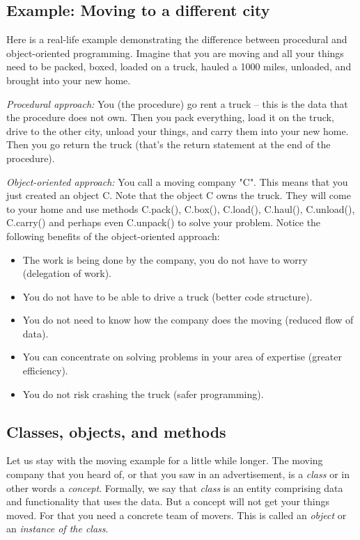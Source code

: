 \subsection{Example: Moving to a different city}

Here is a real-life example demonstrating the difference between 
procedural and object-oriented programming. Imagine that you are moving 
and all your things need to be packed, boxed, loaded on a truck, hauled 
a 1000 miles, unloaded, and brought into your new home. 

{\em Procedural approach:} You (the procedure) 
go rent a truck -- this is the data that the procedure does not own. Then
you pack everything, load it on the truck, drive to the other city, 
unload your things, and carry them into your new home. Then you go 
return the truck (that's the return statement at the end of the procedure).

{\em Object-oriented approach:} You call a moving company "C". This means 
that you just created an object C. Note that the 
object C owns the truck. They will come to your home and use methods 
C.pack(), C.box(), C.load(), C.haul(), C.unload(), C.carry() and perhaps 
even C.unpack() to solve your problem. Notice the following benefits of the object-oriented approach: 
\begin{itemize}
\item The work is being done by the company, 
      you do not have to worry (delegation of work).
\item You do not have to be able to drive a truck (better code structure). 
\item You do not need to know how the company does the moving (reduced flow of data).
\item You can concentrate on solving problems 
      in your area of expertise (greater efficiency).
\item You do not risk crashing the truck (safer programming).
\end{itemize}

\subsection{Classes, objects, and methods}

Let us stay with the moving example for a little while longer. The moving 
company that you heard of, or that you saw in an advertisement, 
is a {\em class} or in other words a {\em concept}. Formally, we say that 
{\em class} is an entity comprising data and functionality that uses the data.
But a concept will not get your things moved. For that you need a concrete team of 
movers. This is called an {\em object} or an {\em instance of the class}. 


